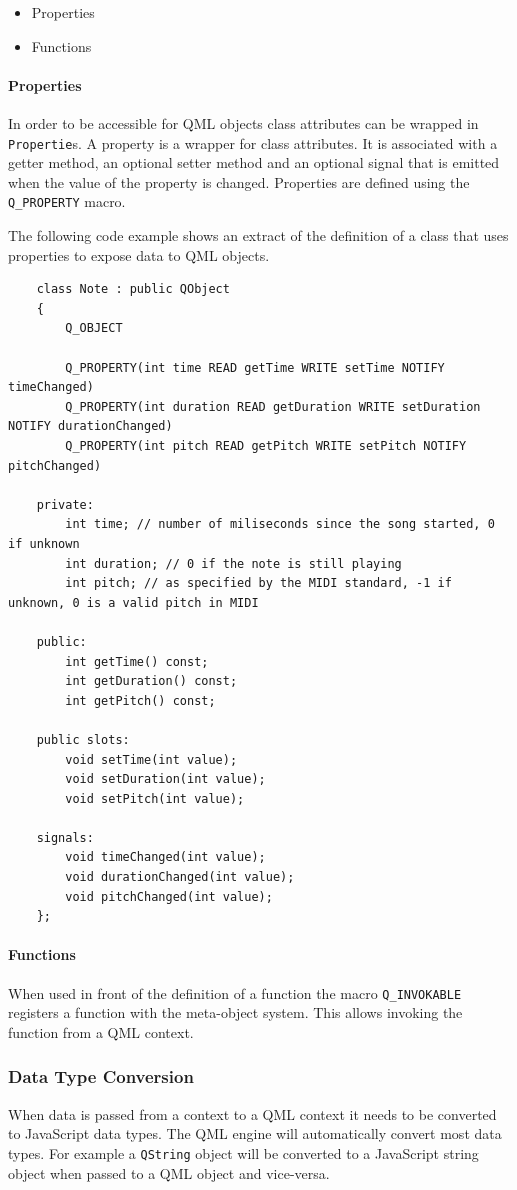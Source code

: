 \begin{itemize}
	\item{Properties}
	\item{Functions}
\end{itemize}

\paragraph{Properties}
In order to be accessible for QML objects class attributes can be wrapped in {\tt Propertie}s.
A property is a wrapper for class attributes. It is associated with a getter method,  an optional setter method and an optional signal that is emitted when the value of the property is changed.
Properties are defined using the {\tt Q\_PROPERTY} macro.

The following code example shows an extract of the definition of a class that uses properties to expose data to QML objects.
\begin{lstlisting}
	class Note : public QObject
	{
	    Q_OBJECT
	
	    Q_PROPERTY(int time READ getTime WRITE setTime NOTIFY timeChanged)
	    Q_PROPERTY(int duration READ getDuration WRITE setDuration NOTIFY durationChanged)
	    Q_PROPERTY(int pitch READ getPitch WRITE setPitch NOTIFY pitchChanged)
	
	private:
	    int time; // number of miliseconds since the song started, 0 if unknown
	    int duration; // 0 if the note is still playing
	    int pitch; // as specified by the MIDI standard, -1 if unknown, 0 is a valid pitch in MIDI

	public:
	    int getTime() const;
	    int getDuration() const;
	    int getPitch() const;
	
	public slots:
	    void setTime(int value);
	    void setDuration(int value);
	    void setPitch(int value);
	
	signals:
	    void timeChanged(int value);
	    void durationChanged(int value);
	    void pitchChanged(int value);
	};
\end{lstlisting}

\paragraph{Functions}
When used in front of the definition of a function the macro {\tt Q\_INVOKABLE} registers a function with the meta-object system. This allows invoking the function from a QML context. 
\subsubsection{Data Type Conversion}
When data is passed from a \cpp context to a QML context it needs to be converted to JavaScript data types. The QML engine will automatically convert most \cpp data types. For example a {\tt QString} object will be converted to a JavaScript string object when passed to a QML object and vice-versa.

